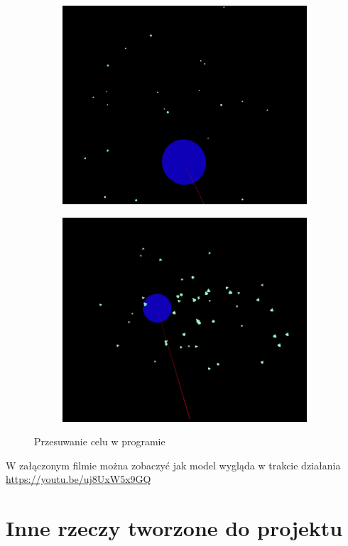 \documentclass[a4paper,12pt,reqno]{article}
\begin{document}
\begin{figure}[H]%
	\centering
	\begin{subfigure}{.5\textwidth}
		\centering
		\includegraphics[width=0.8\linewidth]{graphics//boids/BoidsInUE_3.png}
		\label{ref:subref_a}
	\end{subfigure}%
	\begin{subfigure}{.5\textwidth}
		\centering
		\includegraphics[width=0.8\linewidth]{graphics//boids/BoidsInUE_4.png}
		\label{ref:subref_b}
	\end{subfigure}%
\caption{Przesuwanie celu w programie}
\label{ref:ref}
\end{figure}

W załączonym filmie można zobaczyć jak model wygląda w trakcie działania \url{https://youtu.be/uj8UxW5x9GQ}

\newpage
\section{Inne rzeczy tworzone do projektu}
\end{document}
